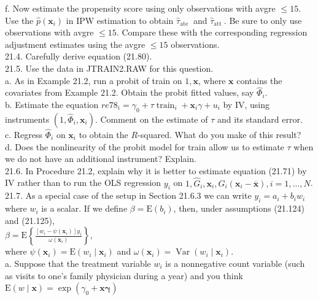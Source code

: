 \documentclass[10pt]{article}
\begin{document}
f. Now estimate the propensity score using only observations with avgre $\leq 15$. Use the $\hat{p}\left(\mathbf{x}_{i}\right)$ in IPW estimation to obtain $\hat{\tau}_{\text {ate }}$ and $\hat{\tau}_{\text {att }}$. Be sure to only use observations with avgre $\leq 15$. Compare these with the corresponding regression adjustment estimates using the avgre $\leq 15$ observations.\\
21.4. Carefully derive equation (21.80).\\
21.5. Use the data in JTRAIN2.RAW for this question.\\
a. As in Example 21.2, run a probit of train on $1, \mathbf{x}$, where $\mathbf{x}$ contains the covariates from Example 21.2. Obtain the probit fitted values, say $\hat{\Phi}_{i}$.\\
b. Estimate the equation $r e 78_{i}=\gamma_{0}+\tau \operatorname{train}_{i}+\mathbf{x}_{i} \gamma+u_{i}$ by IV, using instruments $\left(1, \hat{\Phi}_{i}, \mathbf{x}_{i}\right)$. Comment on the estimate of $\tau$ and its standard error.\\
c. Regress $\hat{\Phi}_{i}$ on $\mathbf{x}_{i}$ to obtain the $R$-squared. What do you make of this result?\\
d. Does the nonlinearity of the probit model for train allow us to estimate $\tau$ when we do not have an additional instrument? Explain.\\
21.6. In Procedure 21.2, explain why it is better to estimate equation (21.71) by IV rather than to run the OLS regression $y_{i}$ on $1, \hat{G}_{i}, \mathbf{x}_{i}, \hat{G}_{i}\left(\mathbf{x}_{i}-\overline{\mathbf{x}}\right), i=1, \ldots, N$.\\
21.7. As a special case of the setup in Section 21.6.3 we can write $y_{i}=a_{i}+b_{i} w_{i}$ where $w_{i}$ is a scalar. If we define $\beta=\mathrm{E}\left(b_{i}\right)$, then, under assumptions (21.124) and (21.125),\\
$\beta=\mathrm{E}\left\{\frac{\left[w_{i}-\psi\left(\mathbf{x}_{i}\right)\right] y_{i}}{\omega\left(\mathbf{x}_{i}\right)}\right\}$,\\
where $\psi\left(\mathbf{x}_{i}\right)=\mathrm{E}\left(w_{i} \mid \mathbf{x}_{i}\right)$ and $\omega\left(\mathbf{x}_{i}\right)=\operatorname{Var}\left(w_{i} \mid \mathbf{x}_{i}\right)$.\\
a. Suppose that the treatment variable $w_{i}$ is a nonnegative count variable (such as visits to one's family physician during a year) and you think $\mathrm{E}(w \mid \mathbf{x})=\exp \left(\gamma_{0}+\mathbf{x} \boldsymbol{\gamma}\right)$\\
\end{document}
